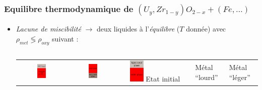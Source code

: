 \subsubsection{Equilibre thermodynamique de $\left(U_y,Zr_{1-y}\right)O_{2-x}+\left(Fe, \dots\right)$}
\begin{frame}
	\baselineskip
	\begin{itemize}
	\item \emph{Lacune de miscibilité} $\rightarrow$ deux liquides à l'\emph{équilibre} ($T$ donnée) avec \emph{$\rho_{met}\lessgtr \rho_{oxy}$} suivant :
	\begin{columns}[T]
	\begin{column}{0.45\textwidth}
	\begin{tabularx}{\textwidth}{CCC}
	\includegraphics[width=0.2\textwidth]{Figures/schema_stratif_2_ini.eps} & 
	\includegraphics[width=0.2\textwidth]{Figures/schema_stratif_2_hm.eps} &
	\includegraphics[width=0.2\textwidth]{Figures/schema_stratif_2_lm.eps} \n
	\tiny Etat initial & \tiny Métal ``lourd'' & \tiny Métal ``léger''
	\end{tabularx}
	\end{column}

\end{columns}
\end{itemize}
\end{frame}
